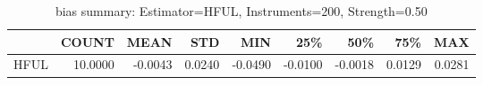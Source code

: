 \begin{table}[ht]
\centering
\caption{bias summary: Estimator=HFUL, Instruments=200, Strength=0.50}
\begin{tabular}{lrrrrrrrr}
\toprule
 & COUNT & MEAN & STD & MIN & 25\% & 50\% & 75\% & MAX \\
\midrule
HFUL & 10.0000 & -0.0043 & 0.0240 & -0.0490 & -0.0100 & -0.0018 & 0.0129 & 0.0281 \\
\bottomrule
\end{tabular}
\end{table}
